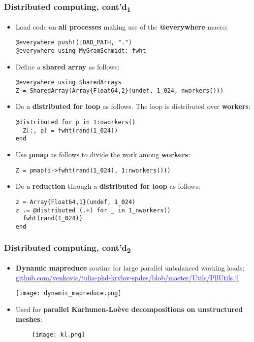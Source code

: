 \documentclass[t,usepdftitle=false]{beamer}
\begin{document}
\begin{frame}[fragile]
\frametitle{Distributed computing, cont'd\textsubscript{1}}
\begin{itemize}
\item Load code on \textbf{all processes} making use of the \textbf{@everywhere} macro:
\begin{verbatim}
@everywhere push!(LOAD_PATH, ".")
@everywhere using MyGramSchmidt: fwht
\end{verbatim}
\item Define a \textbf{shared array} as follows:
\begin{verbatim}
@everywhere using SharedArrays
Z = SharedArray(Array{Float64,2}(undef, 1_024, nworkers()))
\end{verbatim}
\item Do a \textbf{distributed for loop} as follows. The loop is distributed over \textbf{workers}:
\begin{verbatim}
@distributed for p in 1:nworkers()
  Z[:, p] = fwht(rand(1_024))
end
\end{verbatim}
\item Use \textbf{pmap} as follows to divide the work among \textbf{workers}:
\begin{verbatim}
Z = pmap(i->fwht(rand(1_024), 1:nworkers()))
\end{verbatim}
\item Do a \textbf{reduction} through a \textbf{distributed for loop} as follows:\small
\begin{verbatim}
z = Array{Float64,1}(undef, 1_024)
z .= @distributed (.+) for _ in 1_nworkers()
  fwht(rand(1_024))
end
\end{verbatim}
\end{itemize}
\end{frame}

\begin{frame}
\frametitle{Distributed computing, cont'd\textsubscript{2}}
\begin{itemize}
\item \textbf{Dynamic mapreduce} routine for large parallel unbalanced working loads:\\
\href{github.com/venkovic/julia-phd-krylov-spdes/blob/master/Utils/PllUtils.jl}{\textcolor{blue}{github.com/venkovic/julia-phd-krylov-spdes/blob/master/Utils/PllUtils.jl}}
\begin{center}\texttt{[image: dynamic\_mapreduce.png]}\end{center}
\item Used for \textbf{parallel Karhunen-Loève decompositions on unstructured meshes}:\vspace{-.3cm}\\
\begin{center}$\hspace{1cm}$\texttt{[image: kl.png]}\end{center}
\end{itemize}
\end{frame}
\end{document}
